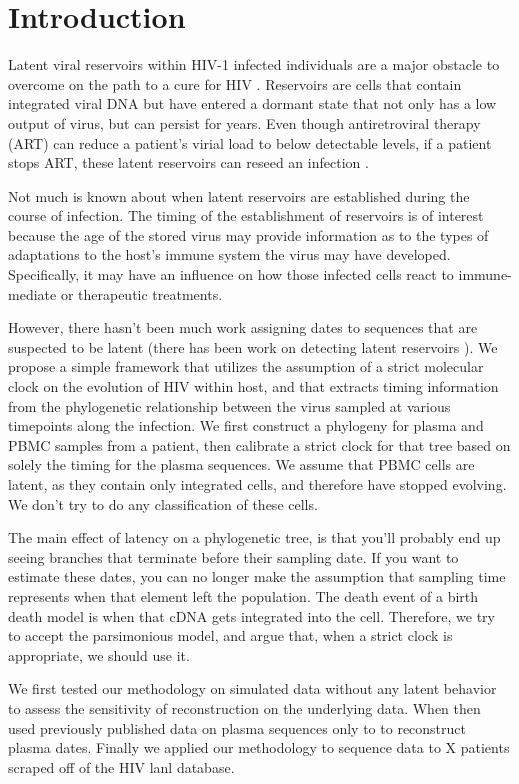 \section{Introduction} \label{sec:intro}
Latent viral reservoirs within HIV-1 infected individuals are a major obstacle to overcome on the path to a cure for HIV \citep{Pace11}. Reservoirs are cells that contain integrated viral DNA but have entered a dormant state that not only has a low output of virus, but can persist for years. Even though antiretroviral therapy (ART) can reduce a patient's virial load to below detectable levels, if a patient stops ART, these latent reservoirs can reseed an infection \citep{Joos08, Pomerantz03, Richman09}.

Not much is known about when latent reservoirs are established during the course of infection. The timing of the establishment of reservoirs is of interest because the age of the stored virus may provide information as to the types of adaptations to the host's immune system the virus may have developed. Specifically, it may have an influence on how those infected cells react to immune-mediate or therapeutic treatments. 

However, there hasn't been much work assigning dates to sequences that are suspected to be latent (there has been work on detecting latent reservoirs \cite{Immonen14}). We propose a simple framework that utilizes the assumption of a strict molecular clock on the evolution of HIV within host, and that extracts timing information from the phylogenetic relationship between the virus sampled at various timepoints along the infection. We first construct a phylogeny for plasma and PBMC samples from a patient, then calibrate a strict clock for that tree based on solely the timing for the plasma sequences. We assume that PBMC cells are latent, as they contain only integrated cells, and therefore have stopped evolving. We don't try to do any classification of these cells.

The main effect of latency on a phylogenetic tree, is that you'll probably end up seeing branches that terminate before their sampling date. If you want to estimate these dates, you can no longer make the assumption that sampling time represents when that element left the population. The death event of a birth death model is when that cDNA gets integrated into the cell. Therefore, we try to accept the parsimonious model, and argue that, when a strict clock is appropriate, we should use it. 

We first tested our methodology on simulated data without any latent behavior to assess the sensitivity of reconstruction on the underlying data. When then used previously published data on plasma sequences only to to reconstruct plasma dates. Finally we applied our methodology to sequence data to X patients scraped off of the HIV lanl database. 

